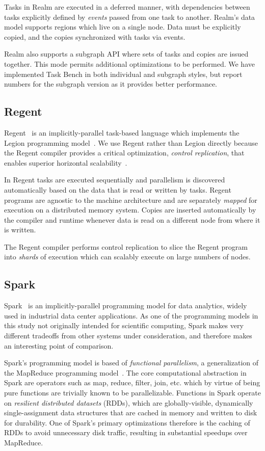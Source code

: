 Tasks in Realm are executed in a deferred manner, with dependencies
between tasks explicitly defined by \emph{events} passed from one task
to another. Realm's data model supports regions which live on a single
node. Data must be explicitly copied, and the copies synchronized with
tasks via events.

Realm also supports a subgraph API where sets of tasks and copies are
issued together. This mode permits additional optimizations to be
performed. We have implemented Task Bench in both individual and
subgraph styles, but report numbers for the subgraph version as it
provides better performance.

\subsection{Regent}

Regent~\cite{Regent15} is an implicitly-parallel task-based language
which implements the Legion programming model~\cite{Legion12}. We use
Regent rather than Legion directly because the Regent compiler
provides a critical optimization, \emph{control replication}, that
enables superior horizontal scalability~\cite{ControlReplication17}.

In Regent tasks are executed sequentially and parallelism is
discovered automatically based on the data that is read or written by
tasks. Regent programs are agnostic to the machine architecture and
are separately \emph{mapped} for execution on a distributed memory
system. Copies are inserted automatically by the compiler and runtime
whenever data is read on a different node from where it is written.

The Regent compiler performs control replication to slice the Regent
program into \emph{shards} of execution which can scalably execute on
large numbers of nodes.

\subsection{Spark}

Spark~\cite{Spark10} is an implicitly-parallel programming model for
data analytics, widely used in industrial data center applications. As
one of the programming models in this study not originally intended
for scientific computing, Spark makes very different tradeoffs from
other systems under consideration, and therefore makes an interesting
point of comparison.

Spark's programming model is based of \emph{functional parallelism}, a
generalization of the MapReduce programming
model~\cite{MapReduce04}. The core computational abstraction in Spark
are operators such as map, reduce, filter, join, etc. which by virtue
of being pure functions are trivially known to be
parallelizable. Functions in Spark operate on \emph{resilient
  distributed datasets} (RDDs), which are globally-visible,
dynamically single-assignment data structures that are cached in memory
and written to disk for durability. One of Spark's primary
optimizations therefore is the caching of RDDs to avoid unnecessary
disk traffic, resulting in substantial speedups over MapReduce.

